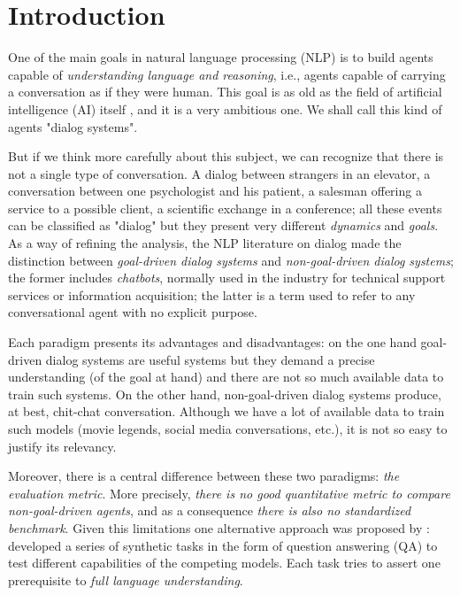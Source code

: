 \chapter{Introduction}
\label{ch:01-introduction}

One of the main goals in natural language processing (NLP) is to build agents capable of \textit{understanding language and reasoning}, i.e., agents capable of carrying a conversation as if they were human. This goal is as old as the field of artificial intelligence (AI) itself \cite{Turing}, and it is a very ambitious one. We shall call this kind of agents "dialog systems".

But if we think more carefully about this subject, we can recognize that there is not a single type of conversation. A dialog between strangers in an elevator, a conversation between one psychologist and his patient, a salesman offering a service to a possible client, a scientific exchange in a conference; all these events can be classified as "dialog" but they present very different \textit{dynamics} and \textit{goals}. As a way of refining the analysis, the NLP literature on dialog made the distinction between \textit{goal-driven dialog systems} and \textit{non-goal-driven dialog systems}; the former includes \textit{chatbots}, normally used in the industry for technical support services or information acquisition; the latter is a term used to refer to any conversational agent with no explicit purpose.

Each paradigm presents its advantages and disadvantages: on the one hand goal-driven dialog systems are useful systems but they demand a precise understanding (of the goal at hand) and there are not so much available data to train such systems. On the other hand, non-goal-driven dialog systems produce, at best, chit-chat conversation. Although we have a lot of available data to train such models (movie legends, social media conversations, etc.), it is not so easy to justify its relevancy. 

Moreover, there is a central difference between these two paradigms: \textit{the evaluation metric}. More precisely, \textit{there is no good quantitative metric to compare non-goal-driven agents}, and as a consequence \textit{there is also no standardized benchmark}. Given this limitations one alternative approach was proposed by \cite{WestonBCM15}: developed a series of synthetic tasks in the form of question answering (QA) to test different capabilities of the competing models. Each task tries to assert one prerequisite to \textit{full language understanding}.

